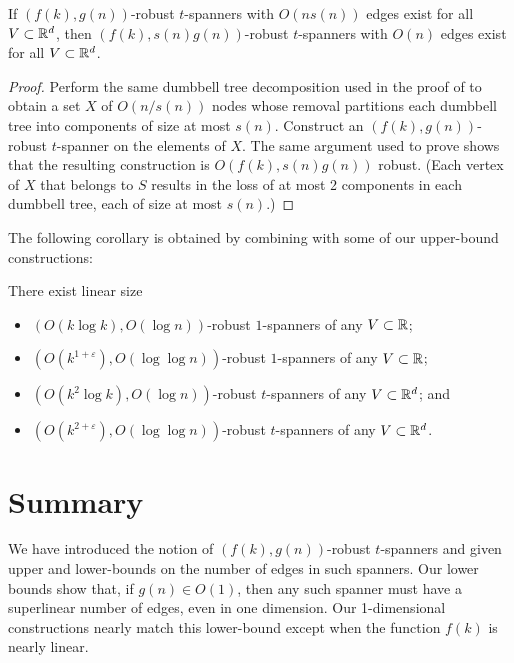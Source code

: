 \documentclass{patmorin}
\newcommand{\eps}{\varepsilon}
\begin{document}
\begin{thm}
  If $(f(k),g(n))$-robust $t$-spanners with $O(n s(n))$ edges exist for
  all $V\subset\mathbb{R}^d$, then $(f(k),s(n)g(n))$-robust $t$-spanners with
  $O(n)$ edges exist for all $V\subset\mathbb{R}^d$.
\end{thm}

\begin{proof}
  Perform the same dumbbell tree decomposition used in the proof of
   to obtain a set $X$ of $O(n/s(n))$ nodes whose removal
  partitions each dumbbell tree into components of size at most $s(n)$.
  Construct an $(f(k),g(n))$-robust $t$-spanner on the elements of $X$.
  The same argument used to prove  shows that the resulting
  construction is $O(f(k),s(n)g(n))$ robust.  (Each vertex of $X$ that
  belongs to $S$ results in the loss of at most 2 components in each
  dumbbell tree, each of size at most $s(n)$.)
\end{proof}

The following corollary is obtained by combining 
with some of our upper-bound constructions:
\begin{cor}
  There exist linear size
  \begin{itemize}
    \item $(O(k\log k),O(\log n))$-robust $1$-spanners of any
      $V\subset \mathbb{R}$;
    \item $(O(k^{1+\eps}),O(\log\log n))$-robust $1$-spanners of any
      $V\subset \mathbb{R}$;
    \item $(O(k^2\log k), O(\log n))$-robust $t$-spanners of any
      $V\subset \mathbb{R}^d$; and
    \item $(O(k^{2+\eps}), O(\log\log n))$-robust $t$-spanners of any
      $V\subset \mathbb{R}^d$.
  \end{itemize}
\end{cor}

\section{Summary}

We have introduced the notion of $(f(k),g(n))$-robust $t$-spanners and
given upper and lower-bounds on the number of edges in such spanners.
Our lower bounds show that, if $g(n)\in O(1)$, then any such spanner
must have a superlinear number of edges, even in one dimension.  Our
1-dimensional constructions nearly match this lower-bound except when the
function $f(k)$ is nearly linear.
\end{document}
